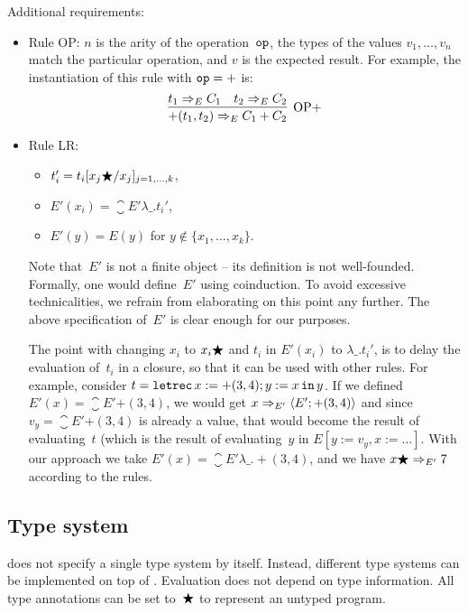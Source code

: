 \documentclass[
    9pt,            %
    techreport,        %
    affiltop,       %
]{art}
\begin{document}
Additional requirements:
\begin{itemize}
\item Rule OP: $n$ is the arity of the operation~$\mathtt{op}$, the types of the
values $v_1,\ldots,v_n$ match the particular operation, and $v$ is the
expected result. For example, the instantiation of this rule with $\mathtt{op} =
{+}$ is:
\[
\infer[\mathrm{OP}{+}]{\eval{{+}(t_1,t_2)}{E}{C_1 + C_2}}{\eval{t_1}{E}{C_1} & \eval{t_2}{E}{C_2}}
\]
\item Rule LR:
    \begin{itemize}
    \item $t_i' = t_i[x_j\bigstar/x_j]_{j=1,\ldots,k}$,
    \item $E'(x_i) = \closure{E'}{\lambda \_ . t_i'}$,
    \item $E'(y) = E(y)$ for $y \notin \{x_1,\ldots,x_k\}$.
    \end{itemize}
    Note that~$E'$ is not a finite object -- its definition is not
    well-founded. Formally, one would define~$E'$ using coinduction. To
    avoid excessive technicalities, we refrain from elaborating on this
    point any further. The above specification of~$E'$ is clear enough for
    our purposes.

    The point with changing $x_i$ to $x_i \bigstar$ and $t_i$ in $E'(x_i)$
    to $\lambda \_ . t_i'$, is to delay the evaluation of~$t_i$ in a
    closure, so that it can be used with other rules. For example, consider
    $t = \mathtt{letrec}\,x := {+}(3,4); y := x\,\mathtt{in}\,y$. If we defined $E'(x) =
    \closure{E'}{{+}(3,4)}$, we would get
    $x\Rightarrow_{E'} \langle E'; {+}(3,4) \rangle$ and since $v_y =
    \closure{E'}{{+}(3,4)}$ is already a value, that would become the
    result of evaluating~$t$ (which is the result of evaluating~$y$ in
    $E[y:=v_y,x:=\ldots]$. With our approach we take $E'(x) =
    \closure{E'}{\lambda \_ . {+}(3,4)}$, and we have
    $x\bigstar\Rightarrow_{E'} 7$ according to the rules.
\end{itemize}

\subsection{Type system}\label{sec_type_system}

\JuvixCore{} does not specify a single type system by itself. Instead,
different type systems can be implemented on top of \JuvixCore{}.
Evaluation does not depend on type information. All type annotations can be
set to~$\bigstar$ to represent an untyped program.
\end{document}

